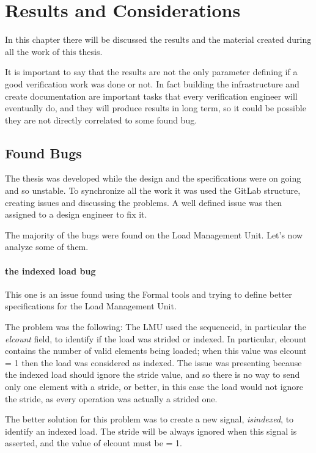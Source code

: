 \chapter{Results and Considerations}
In this chapter there will be discussed the results and the material created during all the work of this thesis.

It is important to say that the results are not the only parameter defining if a good verification work was done or not. In fact building the infrastructure and create documentation are important tasks that every verification engineer will eventually do, and they will produce results in long term, so it could be possible they are not directly correlated to some found bug.


\section{Found Bugs}
The thesis was developed while the design and the specifications were on going and so unstable. To synchronize all the work it was used the GitLab structure, creating issues and discussing the problems. A well defined issue was then assigned to a design engineer to fix it.

The majority of the bugs were found on the Load Management Unit. Let's now analyze some of them.

\subsubsection{the indexed load bug}
This one is an issue found using the Formal tools and trying to define better specifications for the Load Management Unit.

The problem was the following:
The LMU used the sequence\+id, in particular the \emph{el\+count} field, to identify if the load was strided or indexed. In particular, el\+count contains the number of valid elements being loaded; when this value was el\+count = 1 then the load was considered as indexed.
The issue was presenting because the indexed load should ignore the stride value, and so there is no way to send only one element with a stride, or better, in this case the load would not ignore the stride, as every operation was actually a strided one.

The better solution for this problem was to create a new signal, \emph{is\+indexed}, to identify an indexed load. The stride will be always ignored when this signal is asserted, and the value of el\+count must be = 1.

